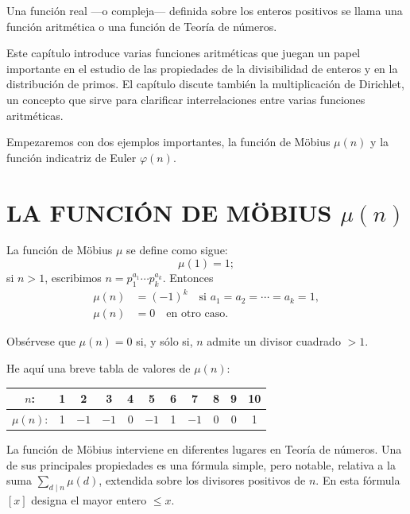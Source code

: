 \documentclass[12pt,a4paper]{book}
\begin{document}
    \begin{definicion}
        Una función real —o compleja— definida sobre los enteros positivos se llama una
        función aritmética o una función de Teoría de números.
    \end{definicion}

    Este capítulo introduce varias funciones aritméticas que juegan un papel importante en
    el estudio de las propiedades de la divisibilidad de enteros y en la distribución de
    primos. El capítulo discute también la multiplicación de Dirichlet, un concepto que
    sirve para clarificar interrelaciones entre varias funciones aritméticas.

    Empezaremos con dos ejemplos importantes, la función de Möbius $\mu(n)$ y la función
    indicatriz de Euler $\varphi(n)$.

    \section{LA FUNCIÓN DE MÖBIUS \texorpdfstring{$\mu(n)$}{μ(n)}}

    \begin{definicion}
        La función de Möbius $\mu$ se define como sigue:
        \begin{equation*}
            \mu(1)=1;
        \end{equation*}
        si $n>1$, escribimos $n=p_1^{a_1}\cdots p_k^{a_k}$. Entonces
        \begin{align*}
            \mu(n)&=(-1)^k \quad\text{si } a_1=a_2=\cdots=a_k=1,\\
            \mu(n)&=0 \quad\text{en otro caso.}
        \end{align*}
    \end{definicion}

    Obsérvese que $\mu(n)=0$ si, y sólo si, $n$ admite un divisor cuadrado $>1$.

    He aquí una breve tabla de valores de $\mu(n)$:
    \begin{center}
        \begin{tabular}{c|cccccccccc}
            $n$: & 1 & 2 & 3 & 4 & 5 & 6 & 7 & 8 & 9 & 10\\
            \hline
            $\mu(n)$: & 1 & $-1$ & $-1$ & 0 & $-1$ & 1 & $-1$ & 0 & 0 & 1
        \end{tabular}
    \end{center}

    La función de Möbius interviene en diferentes lugares en Teoría de números. Una de sus
    principales propiedades es una fórmula simple, pero notable, relativa a la suma
    $\sum_{d\mid n}\mu(d)$, extendida sobre los divisores positivos de $n$. En esta fórmula
    $[x]$ designa el mayor entero $\leq x$.
\end{document}
